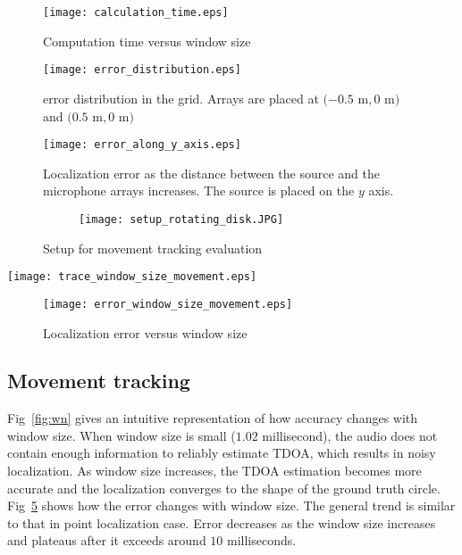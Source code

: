 \begin{figure}[]
\centering
\texttt{[image: calculation\_time.eps]}
\caption{Computation time versus window size}
\label{fig:speed_vs_window}
\end{figure}


\begin{figure}[]
\centering
\texttt{[image: error\_distribution.eps]}
\caption{error distribution in the grid. Arrays are placed at $(-0.5$ m$, 0$ m$)$ and $(0.5$ m$, 0$ m$)$}
\label{fig:error_distribution}
\end{figure}

\begin{figure}[]
\centering
\texttt{[image: error\_along\_y\_axis.eps]}
\caption{Localization error as the distance between the source and the microphone arrays increases. The source is placed on the $y$ axis.}
\label{fig:error_along_y}
\end{figure}


\begin{figure}[]
  \centering
  \begin{subfigure}[]{1.0\textwidth}
    \texttt{[image: setup\_rotating\_disk.JPG]}
  \end{subfigure}
  \caption{Setup for movement tracking evaluation}
  \label{fig:setup_circle}
\end{figure}


\begin{figure*}[]
\centering
  \texttt{[image: trace\_window\_size\_movement.eps]}
\caption{Localization quality versus window size}\label{fig:wn}
\label{fig:trace_win_circle}
\end{figure*}

\begin{figure}[]
\centering
\texttt{[image: error\_window\_size\_movement.eps]}
\caption{Localization error versus window size}
\label{fig:err_win_circle}
\end{figure}


\subsection{Movement tracking}

Fig~\ref{fig:wn} gives an intuitive representation of how accuracy changes with window size. When window size is small ($1.02$ millisecond), the audio does not contain enough information to reliably estimate TDOA, which results in noisy localization. As window size increases, the TDOA estimation becomes more accurate and the localization converges to the shape of the ground truth circle. Fig~\ref{fig:err_win_circle} shows how the error changes with window size. The general trend is similar to that in point localization case. Error decreases as the window size increases and plateaus after it exceeds around $10$ milliseconds.

